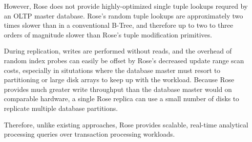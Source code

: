 \documentclass{vldb}
\newcommand{\rows}{Rose\xspace}
\newcommand{\rowss}{Rose's\xspace}
\begin{document}
However, \rows does not provide highly-optimized single tuple lookups
requred by an OLTP master database.  \rowss random tuple lookups are
approximately two times slower than in a conventional B-Tree, and therefore
up to two to three orders of magnitude slower than \rowss tuple
modification primitives.

During replication, writes are performed without reads, and the overhead of random index probes can easily be offset by
\rowss decreased update range scan costs, especially in situtations where the
database master must resort to partitioning or large disk arrays to
keep up with the workload.  Because \rows provides much greater write
throughput than the database master would on comparable hardware, a
single \rows replica can use a small number of disks to replicate
multiple database partitions.

Therefore, unlike existing approaches, \rows provides scalable,
real-time analytical processing queries over transaction processing
workloads.




\end{document}
